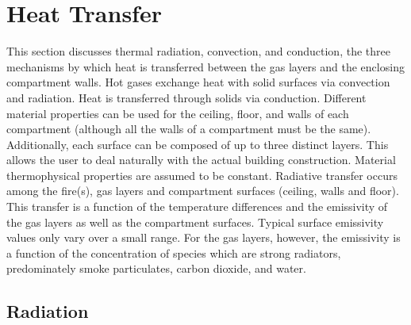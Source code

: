 \documentclass[12pt]{book}
\begin{document}
\chapter{Heat Transfer}

This section discusses thermal radiation, convection, and conduction, the three mechanisms by which heat is transferred between the gas layers and the enclosing compartment walls. Hot gases exchange heat with solid surfaces via convection and radiation. Heat is transferred through solids via conduction. Different material properties can be used for the ceiling, floor, and walls of each compartment (although all the walls of a compartment must be the same).  Additionally, each surface can be composed of up to three distinct layers.  This allows the user to deal naturally with the actual building construction.  Material thermophysical properties are assumed to be constant. Radiative transfer occurs among the fire(s), gas layers and compartment surfaces (ceiling, walls and floor).  This transfer is a function of the temperature differences and the emissivity of the gas layers as well as the compartment surfaces.  Typical surface emissivity values only vary over a small range.  For the gas layers, however, the emissivity is a function of the concentration of species which are strong radiators, predominately smoke particulates, carbon dioxide, and water.

\section{Radiation}
\label{sec:Radiation}
\end{document}
